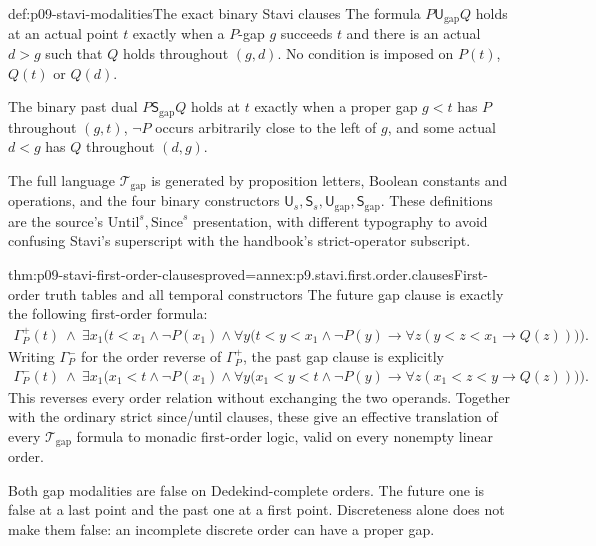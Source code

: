 \begin{hbdefinition}{def:p09-stavi-modalities}{The exact binary Stavi clauses}
The formula \(P\mathbin{\mathsf U_{\mathrm{gap}}}Q\)
holds at an actual point \(t\) exactly when
a \(P\)-gap \(g\) succeeds \(t\) and there
is an actual \(d>g\) such that \(Q\) holds
throughout \((g,d)\).
No condition is imposed on \(P(t)\), \(Q(t)\)
or \(Q(d)\).

The binary past dual
\(P\mathbin{\mathsf S_{\mathrm{gap}}}Q\)
holds at \(t\) exactly when a proper gap
\(g<t\) has \(P\) throughout \((g,t)\),
\(\neg P\) occurs arbitrarily close to
the left of \(g\), and some actual
\(d<g\) has \(Q\) throughout \((d,g)\).

The full language \(\mathcal T_{\mathrm{gap}}\)
is generated by proposition letters, Boolean
constants and operations, and the four
binary constructors
\(\mathsf U_s,\mathsf S_s,
\mathsf U_{\mathrm{gap}},\mathsf S_{\mathrm{gap}}\).
These definitions are the source's
\(\mathrm{Until}^{s},\mathrm{Since}^{s}\)
presentation, with different typography
to avoid confusing Stavi's superscript
with the handbook's strict-operator subscript.
\end{hbdefinition}

\begin{hbtheorem}{thm:p09-stavi-first-order-clauses}{proved=annex:p9.stavi.first.order.clauses}{First-order truth tables and all temporal constructors}
The future gap clause is exactly the
following first-order formula:
\[
\begin{split}
 \Gamma_P^+(t)\ \land\
 \exists x_1\bigl(t<x_1\land\neg P(x_1)\land
  \forall y\bigl(t<y<x_1\land\neg P(y)\to
                    \forall z(y<z<x_1\to Q(z))\bigr)\bigr).
\end{split}
\]
Writing \(\Gamma_P^-\) for the order
reverse of \(\Gamma_P^+\), the past
gap clause is explicitly
\[
\begin{split}
 \Gamma_P^-(t)\ \land\
 \exists x_1\bigl(x_1<t\land\neg P(x_1)\land
  \forall y\bigl(x_1<y<t\land\neg P(y)\to
                    \forall z(x_1<z<y\to Q(z))\bigr)\bigr).
\end{split}
\]
This reverses every order relation
without exchanging the two operands.
Together with the ordinary strict
since/until clauses, these give an
effective translation of every
\(\mathcal T_{\mathrm{gap}}\) formula
to monadic first-order logic, valid
on every nonempty linear order.

Both gap modalities are false on
Dedekind-complete orders. The future
one is false at a last point and
the past one at a first point.
Discreteness alone does not make
them false: an incomplete discrete
order can have a proper gap.
\end{hbtheorem}

